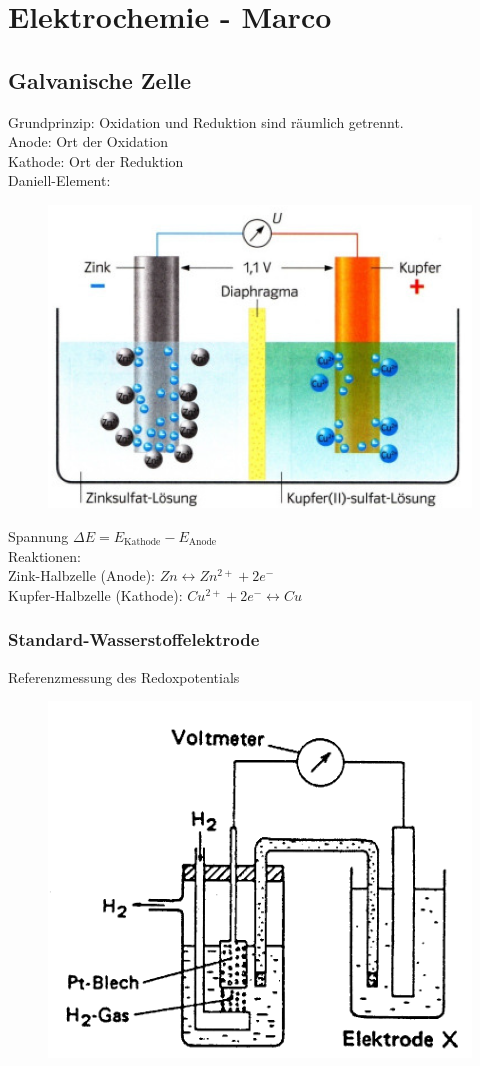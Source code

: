 \section{Elektrochemie - Marco}

\subsection{Galvanische Zelle}
Grundprinzip: Oxidation und Reduktion sind räumlich getrennt. \\
Anode: Ort der Oxidation \\
Kathode: Ort der Reduktion \\

Daniell-Element:
\begin{figure}[htbp!]
	\centering
	\includegraphics[width=0.7\linewidth]{images/10_Daniell_Element.png}
\end{figure}

Spannung $\Delta E = E_\text{Kathode}-E_\text{Anode}$ \\

Reaktionen:\\
Zink-Halbzelle (Anode): $Zn \leftrightarrow Zn^{2+} + 2 e^-$ \\
Kupfer-Halbzelle (Kathode): $Cu^{2+} + 2 e^- \leftrightarrow Cu$ \\

\subsubsection{Standard-Wasserstoffelektrode}
Referenzmessung des Redoxpotentials

\begin{figure}[htbp!]
	\centering
	\includegraphics[width=0.6\linewidth]{images/10_Wasserstoffelektrode.png}
\end{figure}

